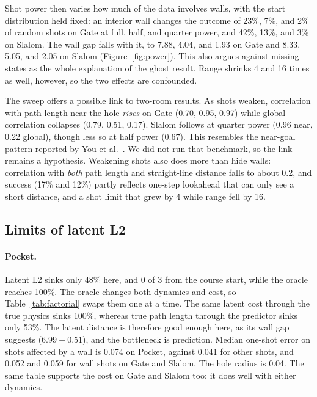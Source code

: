 \documentclass[10pt,twocolumn]{article}
\begin{document}
Shot power then varies how much of the data involves walls, with the start distribution held fixed: an interior wall changes the outcome of 23\%, 7\%, and 2\% of random shots on Gate at full, half, and quarter power, and 42\%, 13\%, and 3\% on Slalom. The wall gap falls with it, to 7.88, 4.04, and 1.93 on Gate and 8.33, 5.05, and 2.05 on Slalom (Figure~\ref{fig:power}). This also argues against missing states as the whole explanation of the ghost result. Range shrinks 4 and 16 times as well, however, so the two effects are confounded.

The sweep offers a possible link to two-room results. As shots weaken, correlation with path length near the hole \emph{rises} on Gate (0.70, 0.95, 0.97) while global correlation collapses (0.79, 0.51, 0.17). Slalom follows at quarter power (0.96 near, 0.22 global), though less so at half power (0.67). This resembles the near-goal pattern reported by You et al.\ \cite{you2026ngc}. We did not run that benchmark, so the link remains a hypothesis. Weakening shots also does more than hide walls: correlation with \emph{both} path length and straight-line distance falls to about 0.2, and success (17\% and 12\%) partly reflects one-step lookahead that can only see a short distance, and a shot limit that grew by 4 while range fell by 16.

\subsection{Limits of latent L2}
\paragraph{Pocket.} Latent L2 sinks only 48\% here, and 0 of 3 from the course start, while the oracle reaches 100\%. The oracle changes both dynamics and cost, so Table~\ref{tab:factorial} swaps them one at a time. The same latent cost through the true physics sinks 100\%, whereas true path length through the predictor sinks only 53\%. The latent distance is therefore good enough here, as its wall gap suggests ($6.99\pm0.51$), and the bottleneck is prediction. Median one-shot error on shots affected by a wall is 0.074 on Pocket, against 0.041 for other shots, and 0.052 and 0.059 for wall shots on Gate and Slalom. The hole radius is 0.04. The same table supports the cost on Gate and Slalom too: it does well with either dynamics.
\end{document}
